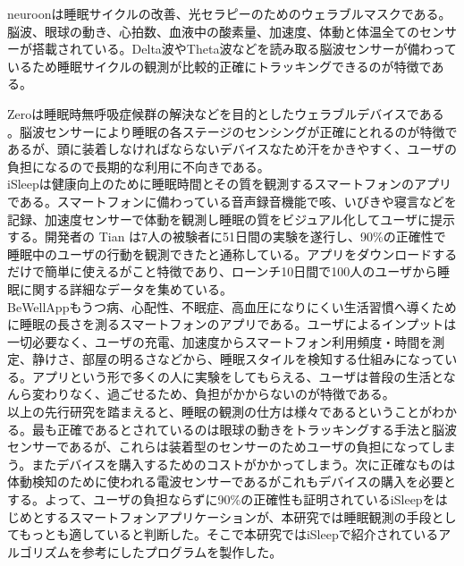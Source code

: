 neuroonは睡眠サイクルの改善、光セラピーのためのウェラブルマスクである。脳波、眼球の動き、心拍数、血液中の酸素量、加速度、体動と体温全てのセンサーが搭載されている\cite{neuroon}。Delta波やTheta波などを読み取る脳波センサーが備わっているため睡眠サイクルの観測が比較的正確にトラッキングできるのが特徴である。

Zeroは睡眠時無呼吸症候群の解決などを目的としたウェラブルデバイスである \cite{beWellApp}。脳波センサーにより睡眠の各ステージのセンシングが正確にとれるのが特徴であるが、頭に装着しなければならないデバイスなため汗をかきやすく、ユーザの負担になるので長期的な利用に不向きである。\\
iSleepは健康向上のために睡眠時間とその質を観測するスマートフォンのアプリである\cite{iSleep}。スマートフォンに備わっている音声録音機能で咳、いびきや寝言などを記録、加速度センサーで体動を観測し睡眠の質をビジュアル化してユーザに提示する。開発者の Tian は7人の被験者に51日間の実験を遂行し、90\%の正確性で睡眠中のユーザの行動を観測できたと通称している。アプリをダウンロードするだけで簡単に使えるがこと特徴であり、ローンチ10日間で100人のユーザから睡眠に関する詳細なデータを集めている。\\
BeWellAppもうつ病、心配性、不眠症、高血圧になりにくい生活習慣へ導くために睡眠の長さを測るスマートフォンのアプリである。ユーザによるインプットは一切必要なく、ユーザの充電、加速度からスマートフォン利用頻度・時間を測定、静けさ、部屋の明るさなどから、睡眠スタイルを検知する仕組みになっている\cite{beWellApp}。アプリという形で多くの人に実験をしてもらえる、ユーザは普段の生活となんら変わりなく、過ごせるため、負担がかからないのが特徴である。\\
以上の先行研究を踏まえると、睡眠の観測の仕方は様々であるということがわかる。最も正確であるとされているのは眼球の動きをトラッキングする手法と脳波センサーであるが、これらは装着型のセンサーのためユーザの負担になってしまう。またデバイスを購入するためのコストがかかってしまう。次に正確なものは体動検知のために使われる電波センサーであるがこれもデバイスの購入を必要とする。よって、ユーザの負担ならずに90\%の正確性も証明されているiSleepをはじめとするスマートフォンアプリケーションが、本研究では睡眠観測の手段としてもっとも適していると判断した。そこで本研究ではiSleepで紹介されているアルゴリズムを参考にしたプログラムを製作した。

